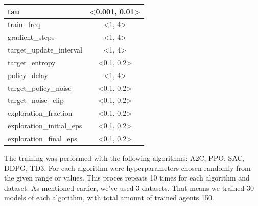 \documentclass[../xlapes02]{subfiles}
\begin{document}
\begin{center}
\begin{tabular}{|l|c|}
            tau                       & <0.001, 0.01>                                   \\ \hline
            train\_freq               & <1, 4>                                          \\ \hline
            gradient\_steps           & <1, 4>                                          \\ \hline
            target\_update\_interval  & <1, 4>                                          \\ \hline
            target\_entropy           & <0.1, 0.2>                                      \\ \hline
            policy\_delay             & <1, 4>                                          \\ \hline
            target\_policy\_noise     & <0.1, 0.2>                                      \\ \hline
            target\_noise\_clip       & <0.1, 0.2>                                      \\ \hline
            exploration\_fraction     & <0.1, 0.2>                                      \\ \hline
            exploration\_initial\_eps & <0.1, 0.2>                                      \\ \hline
            exploration\_final\_eps   & <0.1, 0.2>                                      \\ \hline
        \end{tabular}
    \end{center}

    The training was performed with the following algorithms: A2C, PPO, SAC, DDPG, TD3. For each algorithm were hyperparameters chosen randomly from the given range or values. This proces repeats 10 times for each algorithm and dataset. As mentioned earlier, we've used 3 datasets. That means we trained 30 models of each algorithm, with total amount of trained agents 150.
\end{document}
